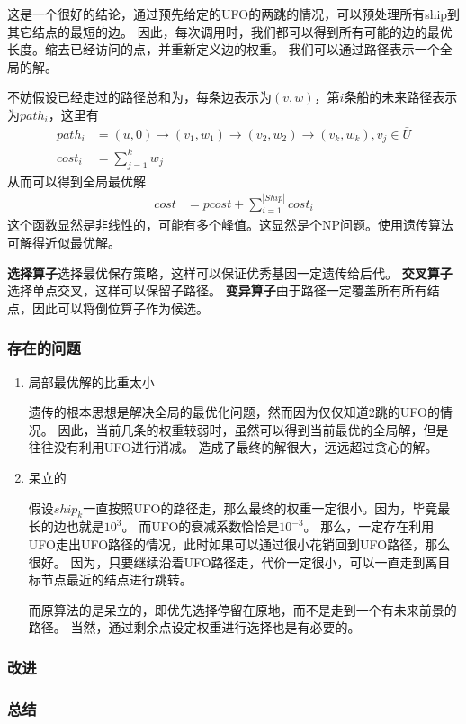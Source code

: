 \documentclass[hyperref,UTF8]{ctexart}
\theoremstyle{definition}
\theoremstyle{remark}
\numberwithin{equation}{subsection}
\newcommand{\Emph}{\textbf}
\begin{document}
	这是一个很好的结论，通过预先给定的UFO的两跳的情况，可以预处理所有ship到其它结点的最短的边。
	因此，每次调用时，我们都可以得到所有可能的边的最优长度。缩去已经访问的点，并重新定义边的权重。
	我们可以通过路径表示一个全局的解。
	
	不妨假设已经走过的路径总和为，每条边表示为$(v, w)$，第$i$条船的未来路径表示为$path_i$，这里有
	\begin{align}
		path_i &= (u, 0) \rightarrow (v_1, w_1) \rightarrow (v_2, w_2) \rightarrow (v_k, w_k), v_j \in \bar{U}	\\
		cost_i &= \sum_{j=1}^{k} w_j
	\end{align}
	从而可以得到全局最优解
	\begin{align}
		cost &= pcost + \sum_{i=1}^{|Ship|} cost_i
	\end{align}
	这个函数显然是非线性的，可能有多个峰值。这显然是个NP问题。使用遗传算法可解得近似最优解。
	
	\Emph{选择算子}选择最优保存策略，这样可以保证优秀基因一定遗传给后代。
	\Emph{交叉算子}选择单点交叉，这样可以保留子路径。
	\Emph{变异算子}由于路径一定覆盖所有所有结点，因此可以将倒位算子作为候选。
	
\subsubsection{存在的问题}

	\begin{enumerate}[(1)]
		
		\item 局部最优解的比重太小
		
		遗传的根本思想是解决全局的最优化问题，然而因为仅仅知道2跳的UFO的情况。
		因此，当前几条的权重较弱时，虽然可以得到当前最优的全局解，但是往往没有利用UFO进行消减。
		造成了最终的解很大，远远超过贪心的解。
		
		\item 呆立的
		
		假设$ship_k$一直按照UFO的路径走，那么最终的权重一定很小。因为，毕竟最长的边也就是$10^3$。
		而UFO的衰减系数恰恰是$10^{-3}$。
		那么，一定存在利用UFO走出UFO路径的情况，此时如果可以通过很小花销回到UFO路径，那么很好。
		因为，只要继续沿着UFO路径走，代价一定很小，可以一直走到离目标节点最近的结点进行跳转。
		
		而原算法的是呆立的，即优先选择停留在原地，而不是走到一个有未来前景的路径。
		当然，通过剩余点设定权重进行选择也是有必要的。
		
	\end{enumerate}

\subsubsection{改进}

\subsubsection{总结}
	
\end{document}
